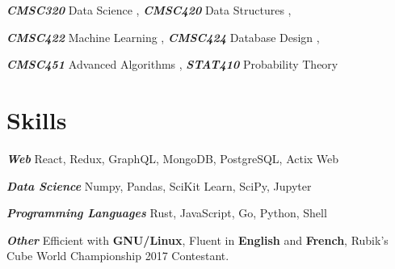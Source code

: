 \documentclass[12pt]{article}
\newcommand{\smalltitle}[2]{
   \textbf{\textit{#1}} #2

   \smallskip
}
\newcommand{\course}[2]{
  {\small {\textbf{\textit{#1}}} {#2}}
}
\begin{document}
    \course{CMSC320}{Data Science}, \course{CMSC420}{Data Structures},
    \course{CMSC422}{Machine Learning}, \course{CMSC424}{Database Design},
    \course{CMSC451}{Advanced Algorithms}, \course{STAT410}{Probability Theory}

    \section{Skills}

    \smalltitle{Web}{
      React, Redux, GraphQL, MongoDB, PostgreSQL, Actix Web
    }

    \smalltitle{Data Science}{
      Numpy, Pandas, SciKit Learn, SciPy, Jupyter
    }

    \smalltitle{Programming Languages}{
      Rust, JavaScript, Go, Python, Shell
    }

    \smalltitle{Other}{
      Efficient with {\bf GNU/Linux}, Fluent in {\bf English} and {\bf French},
      Rubik's Cube World Championship 2017 Contestant.
    }
\end{document}

